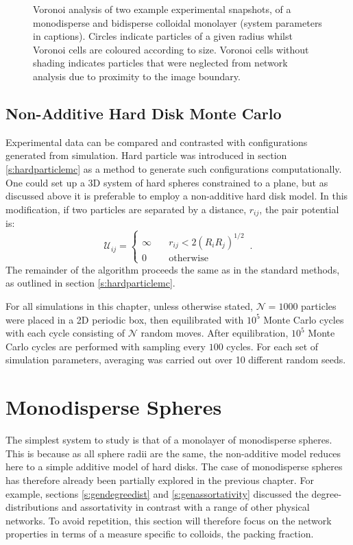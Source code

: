 \begin{figure}[bt]
     \caption{Voronoi analysis of two example experimental snapshots, of a monodisperse and bidisperse \qtd{} colloidal monolayer (system parameters in captions). Circles indicate particles of a given radius whilst Voronoi cells are coloured according to size. Voronoi cells without shading indicates particles that were neglected from network analysis due to proximity to the image boundary.}
     \label{fig:expvoro}
\end{figure}

\subsection{Non\--Additive Hard Disk Monte Carlo}
\label{s:nonaddmc}

Experimental data can be compared and contrasted with configurations generated from simulation.
Hard particle \mc{} was introduced in section \ref{s:hardparticlemc} as a method to generate such configurations computationally.
One could set up a 3D system of hard spheres constrained to a plane, but as discussed above it is preferable to employ a non\--additive hard disk model.
In this modification, if two particles are separated by a distance, $r_{ij}$, the pair potential is:
\begin{equation}
	\mathcal{U}_{ij} = \begin{cases} \infty \quad &r_{ij}<2\left(R_iR_j\right)^{1/2} \\ 0 \quad &\text{otherwise} \end{cases}\,.
\end{equation}
The remainder of the algorithm proceeds the same as in the standard methods, as outlined in section \ref{s:hardparticlemc}.

For all simulations in this chapter, unless otherwise stated, $\mathcal{N}=1000$ particles were placed in a 2D periodic box, then equilibrated with $10^5$ Monte Carlo cycles with each cycle consisting of $\mathcal{N}$ random moves.
After equilibration, $10^5$ Monte Carlo cycles are performed with sampling every $100$ cycles.
For each set of simulation parameters, averaging was carried out over 10 different random seeds.


\section{Monodisperse Spheres}
\label{s:monodisperse}

The simplest \qtd{} system to study is that of a monolayer of monodisperse spheres.
This is because as all sphere radii are the same, the non\--additive model reduces here to a simple additive model of hard disks.
The case of monodisperse spheres has therefore already been partially explored in the previous chapter.
For example, sections \ref{s:gendegreedist} and \ref{s:genassortativity} discussed the degree\--distributions and assortativity in contrast with a range of other physical networks.
To avoid repetition, this section will therefore focus on the network properties in terms of a measure specific to colloids, the packing fraction.

